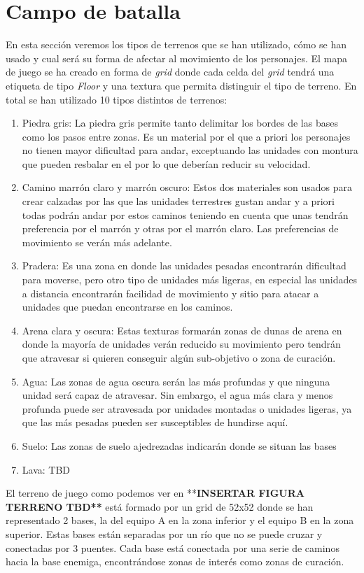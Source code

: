 \section{Campo de batalla}
En esta sección veremos los tipos de terrenos que se han utilizado, cómo se han usado y cual será su forma de afectar al movimiento de los personajes. El mapa de juego se ha creado en forma de \textit{grid} donde cada celda del \textit{grid} tendrá una etiqueta de tipo \textit{Floor} y una textura que permita distinguir el tipo de terreno. En total se han utilizado 10 tipos distintos de terrenos:
\begin{enumerate}
    \item Piedra gris: La piedra gris permite tanto delimitar los bordes de las bases como los pasos entre zonas. Es un material por el que a priori los personajes no tienen mayor dificultad para andar, exceptuando las unidades con montura que pueden resbalar en el por lo que deberían reducir su velocidad.  
    \item Camino marrón claro y marrón oscuro: Estos dos materiales son usados para crear calzadas por las que las unidades terrestres gustan andar y a priori todas podrán andar por estos caminos teniendo en cuenta que unas tendrán preferencia por el marrón y otras por el marrón claro. Las preferencias de movimiento se verán más adelante.
    \item Pradera: Es una zona en donde las unidades pesadas encontrarán dificultad para moverse, pero otro tipo de unidades más ligeras, en especial las unidades a distancia encontrarán facilidad de movimiento y sitio para atacar a unidades que puedan encontrarse en los caminos.
    \item Arena clara y oscura: Estas texturas formarán zonas de dunas de arena en donde la mayoría de unidades verán reducido su movimiento pero tendrán que atravesar si quieren conseguir algún sub-objetivo o zona de curación. 
    \item Agua: Las zonas de agua oscura serán las más profundas y que ninguna unidad será capaz de atravesar. Sin embargo, el agua más clara y menos profunda puede ser atravesada por unidades montadas o unidades ligeras, ya que las más pesadas pueden ser susceptibles de hundirse aquí.
    \item Suelo: Las zonas de suelo ajedrezadas indicarán donde se situan las bases  
    \item Lava: TBD
\end{enumerate}
El terreno de juego como podemos ver en **\textbf{INSERTAR FIGURA TERRENO TBD**} está formado por un grid de 52x52 donde se han representado 2 bases, la del equipo A en la zona inferior y el equipo B en la zona superior. Estas bases están separadas por un río que no se puede cruzar y conectadas por 3 puentes. Cada base está conectada por una serie de caminos hacia la base enemiga, encontrándose zonas de interés como zonas de curación.
